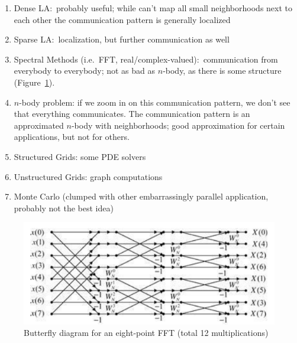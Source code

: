 \begin{enumerate}
    \item Dense LA:\ probably useful; while can't map all small neighborhoods next to each other the communication pattern is generally localized
    \item Sparse LA:\ localization, but further communication as well
    \item Spectral Methods (i.e.\ FFT, real/complex-valued):\ communication from everybody to everybody; not as bad as \( n \)-body, as there is some structure (Figure~\ref{fig:butterfly}).
    \item \( n \)-body problem: if we zoom in on this communication pattern, we don't see that everything communicates.
    The communication pattern is an approximated \( n \)-body with neighborhoods; good approximation for certain applications, but not for others.
    \item Structured Grids: some PDE solvers
    \item Unstructured Grids: graph computations
    \item Monte Carlo (clumped with other embarrassingly parallel application, probably not the best idea)
\end{enumerate}

\begin{figure}
    \centering
    \includegraphics[width = 0.8\linewidth]{butterfly}
    \caption{Butterfly diagram for an eight-point FFT (total 12 multiplications)~\cite{DSP_Tan}}\label{fig:butterfly}
\end{figure}

{}



